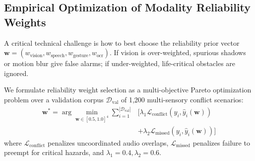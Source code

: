 \documentclass[conference]{IEEEtran}
\begin{document}
\subsection{Empirical Optimization of Modality Reliability Weights}
A critical technical challenge is how to best choose the reliability prior vector $\mathbf{w} = (w_{\text{vision}}, w_{\text{speech}}, w_{\text{gesture}}, w_{\text{ocr}})$. If vision is over-weighted, spurious shadows or motion blur give false alarms; if under-weighted, life-critical obstacles are ignored.

We formulate reliability weight selection as a multi-objective Pareto optimization problem over a validation corpus $\mathcal{D}_{\text{val}}$ of 1,200 multi-sensory conflict scenarios:
\begin{equation}
\begin{aligned}
\mathbf{w}^* = \arg\min_{\mathbf{w} \in [0.5, 1.0]^4} \sum_{i=1}^{|\mathcal{D}_{\text{val}}|} & \Big[ \lambda_1 \mathcal{L}_{\text{conflict}}(y_i, \hat{y}_i(\mathbf{w})) \\
& + \lambda_2 \mathcal{L}_{\text{missed}}(y_i, \hat{y}_i(\mathbf{w})) \Big]
\end{aligned}
\label{eq:weight_opt}
\end{equation}
where $\mathcal{L}_{\text{conflict}}$ penalizes uncoordinated audio overlaps, $\mathcal{L}_{\text{missed}}$ penalizes failure to preempt for critical hazards, and $\lambda_1 = 0.4, \lambda_2 = 0.6$.

\begin{table}[htbp]
\caption{Empirical Benchmark of Weight Configurations on Conflict Scenarios}
\label{tab:weight_candidates}
\centering
{}
\end{table}
\end{document}
